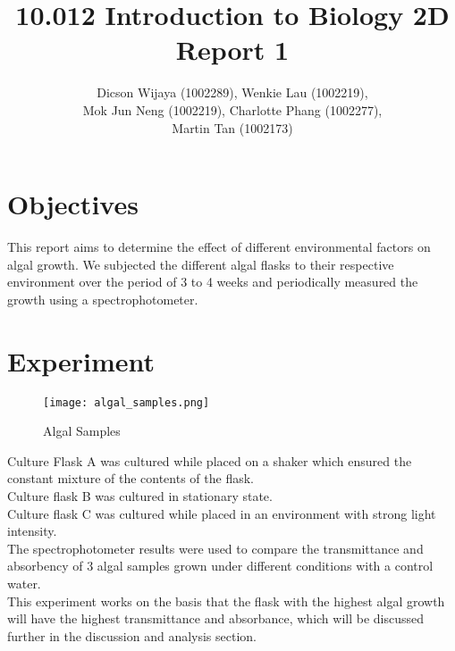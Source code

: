 \documentclass[12pt,a4paper]{IEEEtran}
\author{Dicson Wijaya (1002289), Wenkie Lau (1002219), \\ Mok Jun Neng (1002219), Charlotte Phang (1002277), \\ Martin Tan (1002173)}
\title{10.012 Introduction to Biology 2D Report 1}
\begin{document}
	
	\maketitle
	
	\section{Objectives} \vspace{-0.6in}
	This report aims to determine the effect of different environmental factors on algal growth. We subjected the different algal flasks to their respective environment over the period of 3 to 4 weeks and periodically measured the growth using a spectrophotometer. \vspace{-0.8in}
	
	\section{Experiment} \vspace{-0.9in}
	\begin{figure}[H]
		\begin{center}
			\texttt{[image: algal\_samples.png]}
			\caption{Algal Samples}
			\label{fig:algalsamples}
		\end{center}
	\end{figure} \vspace{-0.4in}
    Culture Flask A was cultured while placed on a shaker which ensured the constant mixture of the contents of the flask. \\
    
    Culture flask B was cultured in stationary state. \\
    
    Culture flask C was cultured while placed in an environment with strong light intensity. \\
    
    The spectrophotometer results were used to compare the transmittance and absorbency of 3 algal samples grown under different conditions with a control water. \\
    
    This experiment works on the basis that the flask with the highest algal growth will have the highest transmittance and absorbance, which will be discussed further in the discussion and analysis section.
    
\end{document}
